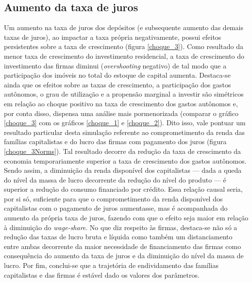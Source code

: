 \subsection*{Aumento da taxa de juros}

Um aumento na taxa de juros dos depósitos (e subsequente aumento das demais taxas de juros), ao impactar a taxa própria negativamente, possui efeitos persistentes sobre a taxa de crescimento (figura \ref{choque_3}). Como resultado da menor taxa de crescimento do investimento residencial, a taxa de crescimento do investimento das firmas diminui (\textit{overshooting} negativo) de tal modo que a participação dos imóveis no total do estoque de capital aumenta. 
Destaca-se ainda que os efeitos sobre as taxas de crescimento, a participação dos gastos autônomos, o grau de utilização e a propensão marginal a investir são simétricos em relação ao choque positivo na taxa de crescimento dos gastos autônomos e, por conta disso, dispensa uma análise mais pormenorizada (comparar o gráfico \ref{choque_3} com os gráficos \ref{choque_1} e \ref{choque_2}).
Dito isso, vale pontuar um resultado particular desta simulação referente ao comprometimento da renda das famílias capitalistas e do lucro das firmas com pagamento dos juros (figura \ref{choque_3Norms}). 
Tal resultado decorre da redução da taxa de crescimento da economia temporariamente superior a taxa de crescimento dos gastos autônomos.
Sendo assim, a diminuição da renda disponível dos capitalistas --- dada a queda do nível da massa de lucro decorrente da redução do nível do produto --- é superior a redução do consumo financiado por crédito.
Essa relação causal seria, por si só, suficiente para que o comprometimento da renda disponível dos capitalistas com o pagamento de juros aumentasse, mas é acompanhada do aumento da própria taxa de juros, fazendo com que o efeito seja maior em relação à diminuição do \textit{wage-share}.
No que diz respeito às firmas, destaca-se não só a redução das taxas de lucro bruta e líquida como também um distanciamento entre ambas decorrente da maior necessidade de financiamento das firmas como consequência do aumento da taxa de juros e da diminuição do nível da massa de lucro.
Por fim, conclui-se que a trajetória de endividamento das famílias capitalistas e das firmas é estável dado os valores dos parâmetros.


